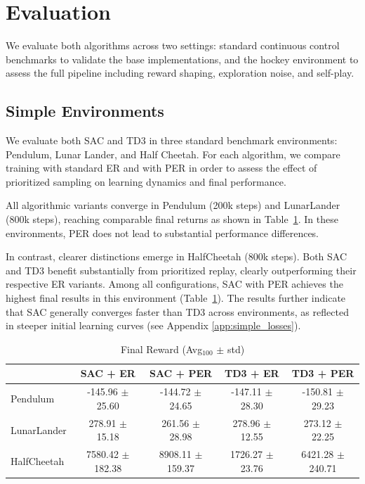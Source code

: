 \section{Evaluation}\label{sec:eval}

We evaluate both algorithms across two settings: standard continuous control benchmarks 
to validate the base implementations, and the hockey environment to assess the full 
pipeline including reward shaping, exploration noise, and self-play.

\subsection{Simple Environments}
We evaluate both \ac{SAC} and \ac{TD3} in three standard benchmark environments: Pendulum, Lunar Lander, and Half Cheetah. 
For each algorithm, we compare training with standard \ac{ER} and with \ac{PER} in order to 
assess the effect of prioritized sampling on learning dynamics and final performance.

All algorithmic variants converge in Pendulum (200k steps) and LunarLander (800k steps), 
reaching comparable final returns as shown in Table~\ref{tab:benchmark_results}. 
In these environments, \ac{PER} does not lead to substantial performance differences.

In contrast, clearer distinctions emerge in HalfCheetah (800k steps). 
Both \ac{SAC} and \ac{TD3} benefit substantially from prioritized replay, 
clearly outperforming their respective \ac{ER} variants. 
Among all configurations, \ac{SAC} with \ac{PER} achieves the highest final 
results in this environment (Table~\ref{tab:benchmark_results}). 
The results further indicate that \ac{SAC} generally converges faster than \ac{TD3} across environments, 
as reflected in steeper initial learning curves (see Appendix \ref{app:simple_losses}). 

\begin{table}[h]
\centering
\caption{Final Reward (Avg$_{100}$ $\pm$ std)}
\vspace{-0.2cm}
\label{tab:benchmark_results}
\begin{tabular}{lcccc}
\toprule
 & \textbf{SAC + ER }& \textbf{SAC + PER }& \textbf{TD3 + ER }& \textbf{TD3 + PER } \\
\hline
Pendulum    & -145.96 $\pm$ 25.60  & -144.72 $\pm$ 24.65 & -147.11 $\pm$ 28.30 & -150.81 $\pm$ 29.23 \\
LunarLander & 278.91 $\pm$ 15.18   & 261.56 $\pm$ 28.98  & 278.96 $\pm$ 12.55  & 273.12 $\pm$ 22.25  \\
HalfCheetah & 7580.42 $\pm$ 182.38 & 8908.11 $\pm$ 159.37 & 1726.27 $\pm$ 23.76 & 6421.28 $\pm$ 240.71\\
\hline
\end{tabular}
\end{table}


